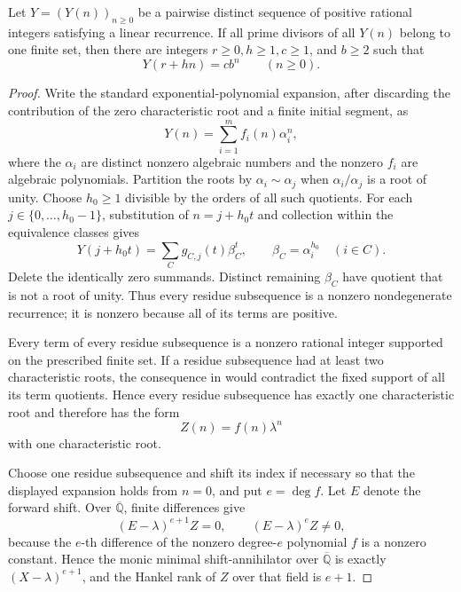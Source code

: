\begin{lemma}
  \label{lem:s-unit-increasing-recurrence-rigidity}
  Let \(Y=(Y(n))_{n\ge0}\) be a pairwise distinct sequence of positive
  rational integers satisfying a linear recurrence. If all prime
  divisors of all \(Y(n)\) belong to one finite set, then there are
  integers \(r\ge0,h\ge1,c\ge1\), and \(b\ge2\) such that
  \[
    Y(r+hn)=cb^n\qquad(n\ge0).
  \]
\end{lemma}

\begin{proof}
  Write the standard exponential-polynomial expansion, after discarding
  the contribution of the zero characteristic root and a finite initial
  segment, as
  \[
    Y(n)=\sum_{i=1}^m f_i(n)\alpha_i^n,
  \]
  where the \(\alpha_i\) are distinct nonzero algebraic numbers and the
  nonzero \(f_i\) are algebraic polynomials. Partition the roots by
  \(\alpha_i\sim\alpha_j\) when \(\alpha_i/\alpha_j\) is a root of
  unity. Choose \(h_0\ge1\) divisible by the orders of all such
  quotients. For each \(j\in\{0,\ldots,h_0-1\}\), substitution of
  \(n=j+h_0t\) and collection within the equivalence classes gives
  \[
    Y(j+h_0t)=\sum_C g_{C,j}(t)\beta_C^t,
    \qquad \beta_C=\alpha_i^{h_0}\quad(i\in C).
  \]
  Delete the identically zero summands. Distinct remaining \(\beta_C\)
  have quotient that is not a root of unity. Thus every residue
  subsequence is a nonzero nondegenerate recurrence; it is nonzero
  because all of its terms are positive.

  Every term of every residue subsequence is a nonzero rational integer
  supported on the prescribed finite set. If a residue subsequence had
  at least two characteristic roots, the consequence in
   would contradict the fixed
  support of all its term quotients. Hence every residue subsequence has
  exactly one characteristic root and therefore has the form
  \[
    Z(n)=f(n)\lambda^n
  \]
  with one characteristic root.

  Choose one residue subsequence and shift its index if necessary so
  that the displayed expansion holds from \(n=0\), and put
  \(e=\deg f\). Let \(E\) denote the forward shift. Over
  \(\overline{\mathbb Q}\), finite differences give
  \[
    (E-\lambda)^{e+1}Z=0,
    \qquad (E-\lambda)^eZ\ne0,
  \]
  because the \(e\)-th difference of the nonzero degree-\(e\) polynomial
  \(f\) is a nonzero constant. Hence the monic minimal shift-annihilator
  over \(\overline{\mathbb Q}\) is exactly
  \((X-\lambda)^{e+1}\), and the Hankel rank of \(Z\) over that field is
  \(e+1\).


\end{proof}
